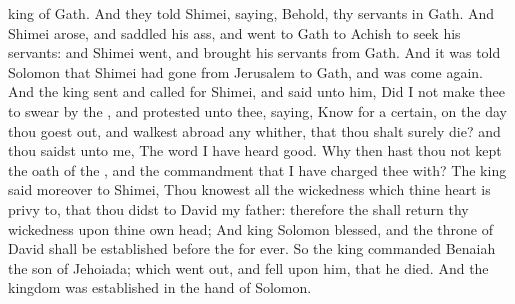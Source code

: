 {king of
Gath. And they
told
Shimei,
saying, Behold, thy
servants
{} in
Gath.
And
Shimei
arose, and
saddled his
ass, and
went to
Gath to
Achish to
seek his
servants: and
Shimei
went, and
brought his
servants from
Gath.
And it was
told
Solomon that
Shimei had
gone from
Jerusalem to
Gath, and was come
again.
And the
king
sent and
called for
Shimei, and
said unto him, Did I not make thee to
swear by the
{}, and
protested unto thee,
saying,
Know for a
certain, on the
day thou goest
out, and
walkest abroad any
whither, that thou shalt
surely
die? and thou
saidst unto me, The
word
{} I have
heard
{}
good.
Why then hast thou not
kept the
oath of the
{}, and the
commandment that I have
charged thee with?
The
king
said moreover to
Shimei, Thou
knowest all the
wickedness which thine
heart is privy
to, that thou
didst to
David my
father: therefore the
{} shall
return thy
wickedness upon thine own
head;
And
king
Solomon
{}
blessed, and the
throne of
David shall be
established
before the
{}
for
ever.
So the
king
commanded
Benaiah the
son of
Jehoiada; which went
out, and
fell upon him, that he
died. And the
kingdom was
established in the
hand of
Solomon.

}
